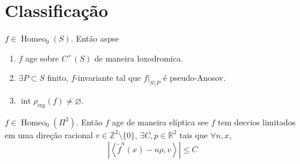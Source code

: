 \section{Classificação}

\begin{thm}[]\leavevmode
$f\in\operatorname{Homeo}_0(S)$. Então aspse
\begin{enumerate}[label=(\roman*)]
	\item $f$ age sobre $C^+(S)$ de maneira loxodromica.
	\item $\exists P\subset S$ finito, $f$-invariante tal que $f|_{S\setminus P}$ é pseudo-Anosov.
	\item $\operatorname{i n t}\rho_{\operatorname{erg}}(f)\neq \varnothing$.
\end{enumerate}
\end{thm}

\begin{thm}\leavevmode
	$f\in\operatorname{Ho m eo}_0(\Pi^2)$. Então $f$ age de maneira elíptica see $f$ tem desvios limitados em uma direção racional $v\in\mathbb{Z}^2\setminus\{0\}$, $\exists C,p\in\mathbb{R}^{2}$ tais que $\forall n,x$,
	\[|\left<\tilde{f}^n(x)-n\rho,v\right> |\leq C\]
\end{thm}

